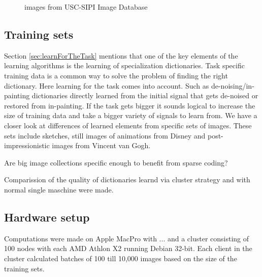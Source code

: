 \begin{figure}[h]
\hspace{5mm}
\caption{images from USC-SIPI Image Database}
\label{fig:USC-SIPI}
\end{figure}

\subsection{Training sets}
Section \ref{sec:learnForTheTask} mentions that one of the key
elements of the learning algorithms is the learning of specialization
dictionaries. Task specific training data is a common way to solve the problem
of finding  the right dictionary. Here learning for the task comes into
account. Such as de-noising/in-painting dictionaries directly learned from the
initial signal that gets de-noised or restored from in-painting. If the task
gets bigger it sounds logical to increase the size of training data and take a
bigger variety of signals to learn from.  We have a closer look at differences
of learned elements from specific sets of images. These sets include sketches,
still images of animations from Disney and post-impressionistic images from
Vincent van Gogh.  

Are big image collections specific enough to benefit from sparse coding?

Comparission of the quality of dictionaries learnd via cluster strategy and
with normal single maschine were made.

\subsection{Hardware setup}
Computations were made on Apple MacPro with ... 
and a cluster consisting of 100 nodes with each AMD Athlon X2  running Debian 32-bit. Each client in the cluster calculated batches of
100 till 10,000 images based on the size of the training sets.

